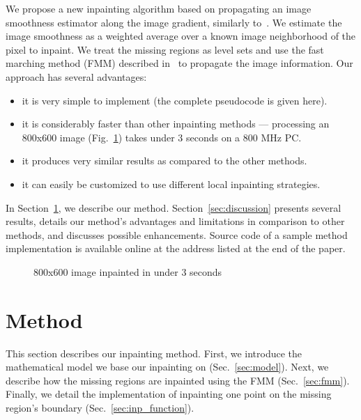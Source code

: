 \documentclass{llncs}
\begin{document}
  We propose a new inpainting algorithm based on propagating an image smoothness estimator along the
image gradient, similarly to~\cite{bertalmio1}. We estimate the image
smoothness as a weighted average over a known image neighborhood of the pixel to
inpaint. We treat the missing regions as level sets and use
the fast marching method (FMM) described in~\cite{sethian} to propagate the
image information. Our approach has several advantages:
\begin{itemize}
  \item it is very simple to implement (the complete pseudocode is given here).
  \item it is considerably faster than other inpainting methods
       --- processing an 800x600 image (Fig.~\ref{fig:example3}) takes under 3 seconds on a 800 MHz PC.
  \item it produces very similar results as compared to the other methods.
  \item it can easily be customized to use different local inpainting strategies.
\end{itemize}
%
%
 In Section~\ref{sec:method}, we describe our method. Section~\ref{sec:discussion}
presents several results, details our method's advantages and limitations
in comparison to other methods, and discusses possible enhancements. Source
code of a sample method implementation is available online at the address
listed at the end of the paper.
%
%
	\begin{figure}[h] \centering
	\caption{800x600 image inpainted in under 3 seconds}
	\label{fig:example3} 
        \end{figure} 
%
%   
%
%
\section{Method}
\label{sec:method}
%
This section describes our inpainting method. First,
we introduce the mathematical model we base our inpainting
on (Sec.~\ref{sec:model}). Next, we describe how the missing regions are
inpainted using the FMM (Sec.~\ref{sec:fmm}). Finally, we detail the
implementation of inpainting one point on the missing region's boundary
(Sec.~\ref{sec:inp_function}).
%
\end{document}
